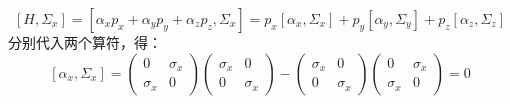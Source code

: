 \begin{equation}
\left[H, \Sigma_{x}\right]=\left[\alpha_{x} p_{x}+\alpha_{y} p_{y}+\alpha_{z} p_{z}, \Sigma_{x}\right]=p_{x}\left[\alpha_{x}, \Sigma_{x}\right]+p_{y}\left[\alpha_{y}, \Sigma_{y}\right]+p_{z}\left[\alpha_{z}, \Sigma_{z}\right]
\end{equation}
分别代入两个算符，得：
\begin{equation}
\left[\alpha_{x}, \Sigma_{x}\right] = \left(\begin{array}{cc}
0 & \sigma_{x} \\
\sigma_{x} & 0
\end{array}\right)\left(\begin{array}{cc}
\sigma_{x} & 0 \\
0 & \sigma_{x}
\end{array}\right)-\left(\begin{array}{cc}
\sigma_{x} & 0 \\
0 & \sigma_{x}
\end{array}\right)\left(\begin{array}{cc}
0 & \sigma_{x} \\
\sigma_{x} & 0
\end{array}\right) = 0
\end{equation}

